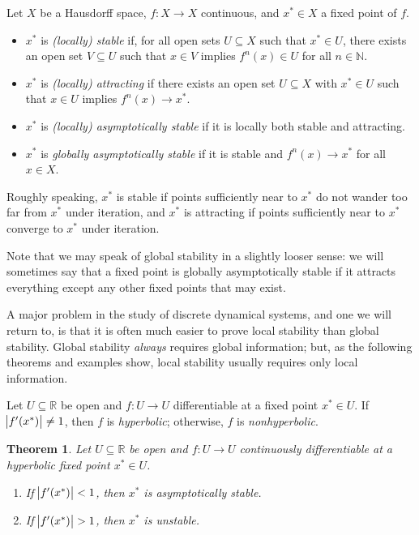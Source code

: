 \documentclass{article}
\newcommand{\naturals}{\mathbb{N}}
\newcommand{\reals}{\mathbb{R}}
\theoremstyle{plain}
\newtheorem{theorem}{Theorem}
\theoremstyle{definition}
\begin{document}
\begin{definition}
  Let \(X\) be a Hausdorff space, \(f : X \to X\) continuous, and \(x^* \in X\) a fixed point of \(f\).
  \begin{itemize}
  \item \(x^*\) is \emph{(locally) stable} if, for all open sets \(U \subseteq X\) such that \(x^* \in U\), there exists an open set \(V \subseteq U\) such that \(x \in V\) implies \(f^n(x) \in U\) for all \(n \in \naturals\).
  \item \(x^*\) is \emph{(locally) attracting} if there exists an open set \(U \subseteq X\) with \(x^* \in U\) such that \(x \in U\) implies \(f^n(x) \to x^*\).
  \item \(x^*\) is \emph{(locally) asymptotically stable} if it is locally both stable and attracting.
  \item \(x^*\) is \emph{globally asymptotically stable} if it is stable and \(f^n(x) \to x^*\) for all \(x \in X\).
  \end{itemize}
\end{definition}

Roughly speaking, \(x^*\) is stable if points sufficiently near to \(x^*\) do not wander too far from \(x^*\) under iteration, and \(x^*\) is attracting if points sufficiently near to \(x^*\) converge to \(x^*\) under iteration.

Note that we may speak of global stability in a slightly looser sense: we will sometimes say that a fixed point is globally asymptotically stable if it attracts everything except any other fixed points that may exist.

A major problem in the study of discrete dynamical systems, and one we will return to, is that it is often much easier to prove local stability than global stability. Global stability \emph{always} requires global information; but, as the following theorems and examples show, local stability usually requires only local information.

\begin{definition}
  Let \(U \subseteq \reals\) be open and \(f : U \to U\) differentiable at a fixed point \(x^* \in U\). If \(\abs{f'(x^*)} \ne 1\), then \(f\) is \emph{hyperbolic}; otherwise, \(f\) is \emph{nonhyperbolic}.
\end{definition}

\begin{theorem}
  Let \(U \subseteq \reals\) be open and \(f : U \to U\) continuously differentiable at a hyperbolic fixed point \(x^* \in U\).
  \begin{enumerate}
  \item If \(\abs{f'(x^*)} < 1\), then \(x^*\) is asymptotically stable.
  \item If \(\abs{f'(x^*)} > 1\), then \(x^*\) is unstable.
  \end{enumerate}
\end{theorem}
\end{document}
